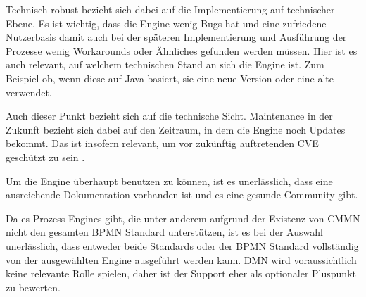 Technisch robust bezieht sich dabei auf die Implementierung auf technischer Ebene. Es ist wichtig, dass die Engine wenig Bugs hat und eine zufriedene Nutzerbasis damit auch bei der späteren Implementierung und Ausführung der Prozesse wenig Workarounds oder Ähnliches gefunden werden müssen. Hier ist es auch relevant, auf welchem technischen Stand an sich die Engine ist. Zum Beispiel ob, wenn diese auf Java basiert, sie eine neue Version oder eine alte verwendet. 

Auch dieser Punkt bezieht sich auf die technische Sicht. Maintenance in der Zukunft bezieht sich dabei auf den Zeitraum, in dem die Engine noch Updates bekommt. Das ist insofern relevant, um vor zukünftig auftretenden \acs{CVE} geschützt zu sein  \citep{mitre_cve_2024}.

Um die Engine überhaupt benutzen zu können, ist es unerlässlich, dass eine ausreichende Dokumentation vorhanden ist und es eine gesunde Community gibt.

Da es Prozess Engines gibt, die unter anderem aufgrund der Existenz von \ac{CMMN} nicht den gesamten \ac{BPMN} Standard unterstützen, ist es bei der Auswahl unerlässlich, dass entweder beide Standards oder der \ac{BPMN} Standard vollständig von der ausgewählten Engine ausgeführt werden kann. \ac{DMN} wird voraussichtlich keine relevante Rolle spielen, daher ist der Support eher als optionaler Pluspunkt zu bewerten.

